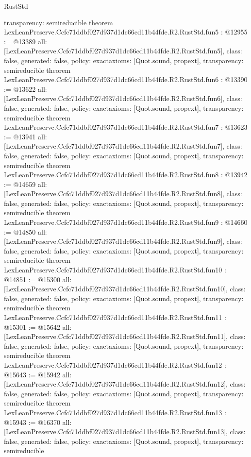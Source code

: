 \begin{lexlean}{RustStd}
\begin{coremodule}
{  transparency: semireducible
}
theorem LexLeanPreserve.Ccfc71ddbf027d937d1dc66cd11b44fde.R2.RustStd.fun5 : @12955 := @13389 {
  all: [LexLeanPreserve.Ccfc71ddbf027d937d1dc66cd11b44fde.R2.RustStd.fun5],
  class: false,
  generated: false,
  policy: exact{axioms: [Quot.sound, propext]},
  transparency: semireducible
}
theorem LexLeanPreserve.Ccfc71ddbf027d937d1dc66cd11b44fde.R2.RustStd.fun6 : @13390 := @13622 {
  all: [LexLeanPreserve.Ccfc71ddbf027d937d1dc66cd11b44fde.R2.RustStd.fun6],
  class: false,
  generated: false,
  policy: exact{axioms: [Quot.sound, propext]},
  transparency: semireducible
}
theorem LexLeanPreserve.Ccfc71ddbf027d937d1dc66cd11b44fde.R2.RustStd.fun7 : @13623 := @13941 {
  all: [LexLeanPreserve.Ccfc71ddbf027d937d1dc66cd11b44fde.R2.RustStd.fun7],
  class: false,
  generated: false,
  policy: exact{axioms: [Quot.sound, propext]},
  transparency: semireducible
}
theorem LexLeanPreserve.Ccfc71ddbf027d937d1dc66cd11b44fde.R2.RustStd.fun8 : @13942 := @14659 {
  all: [LexLeanPreserve.Ccfc71ddbf027d937d1dc66cd11b44fde.R2.RustStd.fun8],
  class: false,
  generated: false,
  policy: exact{axioms: [Quot.sound, propext]},
  transparency: semireducible
}
theorem LexLeanPreserve.Ccfc71ddbf027d937d1dc66cd11b44fde.R2.RustStd.fun9 : @14660 := @14850 {
  all: [LexLeanPreserve.Ccfc71ddbf027d937d1dc66cd11b44fde.R2.RustStd.fun9],
  class: false,
  generated: false,
  policy: exact{axioms: [Quot.sound, propext]},
  transparency: semireducible
}
theorem LexLeanPreserve.Ccfc71ddbf027d937d1dc66cd11b44fde.R2.RustStd.fun10 : @14851 := @15300 {
  all: [LexLeanPreserve.Ccfc71ddbf027d937d1dc66cd11b44fde.R2.RustStd.fun10],
  class: false,
  generated: false,
  policy: exact{axioms: [Quot.sound, propext]},
  transparency: semireducible
}
theorem LexLeanPreserve.Ccfc71ddbf027d937d1dc66cd11b44fde.R2.RustStd.fun11 : @15301 := @15642 {
  all: [LexLeanPreserve.Ccfc71ddbf027d937d1dc66cd11b44fde.R2.RustStd.fun11],
  class: false,
  generated: false,
  policy: exact{axioms: [Quot.sound, propext]},
  transparency: semireducible
}
theorem LexLeanPreserve.Ccfc71ddbf027d937d1dc66cd11b44fde.R2.RustStd.fun12 : @15643 := @15942 {
  all: [LexLeanPreserve.Ccfc71ddbf027d937d1dc66cd11b44fde.R2.RustStd.fun12],
  class: false,
  generated: false,
  policy: exact{axioms: [Quot.sound, propext]},
  transparency: semireducible
}
theorem LexLeanPreserve.Ccfc71ddbf027d937d1dc66cd11b44fde.R2.RustStd.fun13 : @15943 := @16370 {
  all: [LexLeanPreserve.Ccfc71ddbf027d937d1dc66cd11b44fde.R2.RustStd.fun13],
  class: false,
  generated: false,
  policy: exact{axioms: [Quot.sound, propext]},
  transparency: semireducible
}
\end{coremodule}
\end{lexlean}
